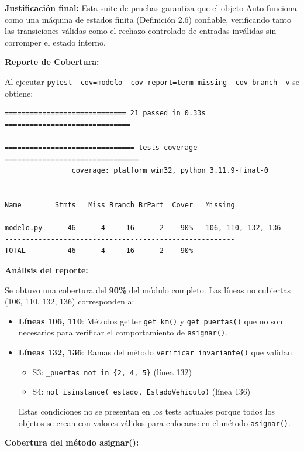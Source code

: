 \textbf{Justificación final:} Esta suite de pruebas garantiza que el objeto Auto funciona como una máquina de estados finita (Definición 2.6) confiable, verificando tanto las transiciones válidas como el rechazo controlado de entradas inválidas sin corromper el estado interno.

\textbf{Reporte de Cobertura:}

Al ejecutar \texttt{pytest --cov=modelo --cov-report=term-missing --cov-branch -v} se obtiene:

\begin{verbatim}
============================= 21 passed in 0.33s ==============================

=============================== tests coverage ================================
_______________ coverage: platform win32, python 3.11.9-final-0 _______________

Name        Stmts   Miss Branch BrPart  Cover   Missing
-------------------------------------------------------
modelo.py      46      4     16      2    90%   106, 110, 132, 136
-------------------------------------------------------
TOTAL          46      4     16      2    90%
\end{verbatim}

\textbf{Análisis del reporte:}

Se obtuvo una cobertura del \textbf{90\%} del módulo completo. Las líneas no cubiertas (106, 110, 132, 136) corresponden a:

\begin{itemize}
    \item \textbf{Líneas 106, 110}: Métodos getter \texttt{get\_km()} y \texttt{get\_puertas()} que no son necesarios para verificar el comportamiento de \texttt{asignar()}.
    
    \item \textbf{Líneas 132, 136}: Ramas del método \texttt{verificar\_invariante()} que validan:
    \begin{itemize}
        \item S3: \texttt{\_puertas not in \{2, 4, 5\}} (línea 132)
        \item S4: \texttt{not isinstance(\_estado, EstadoVehiculo)} (línea 136)
    \end{itemize}
    Estas condiciones no se presentan en los tests actuales porque todos los objetos se crean con valores válidos para enfocarse en el método \texttt{asignar()}.
\end{itemize}

\textbf{Cobertura del método asignar():}

